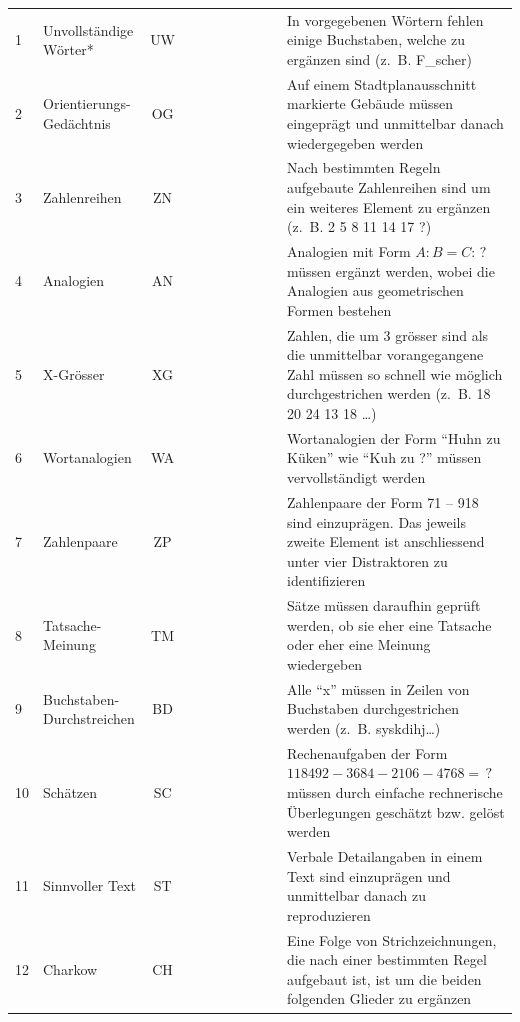 \documentclass[11pt, twoside, a4paper]{book}		%
\begin{document}
\begin{table}
\begin{adjustbox}{width=\textwidth,totalheight=.9\textheight,keepaspectratio}
\begin{threeparttable}
\begin{tabular}{l l c c c c p{.0001cm} c c c p{20cm}}
				\hline
				1				&	Unvollständige Wörter*	&	UW			&&	\checkmark	&&&\checkmark&&& In vorgegebenen Wörtern fehlen einige Buchstaben, welche zu ergänzen sind (z.~B. F\_scher)	\\
				2				&	Orientierungs-Gedächtnis	&	OG		&&&	\checkmark	&&&&\checkmark& Auf einem Stadtplanausschnitt markierte Gebäude müssen eingeprägt und unmittelbar danach wiedergegeben werden\\
				3				&	Zahlenreihen			&	ZN			&	\checkmark	&&&&&\checkmark&& Nach bestimmten Regeln aufgebaute Zahlenreihen sind um ein weiteres Element zu ergänzen (z.~B. 2 5 8 11 14 17 ?)\\
				4				&	Analogien				&	AN			&	\checkmark	&&&&&&\checkmark& Analogien mit Form $A:B=C:\,?$ müssen ergänzt werden, wobei die Analogien aus geometrischen Formen bestehen\\
				5				&	X-Grösser				&	XG			&&	\checkmark	&&&&\checkmark&& Zahlen, die um $3$ grösser sind als die unmittelbar vorangegangene Zahl müssen so schnell wie möglich durchgestrichen werden (z.~B. 18 20 24 \cancel{27} 13 18 \cancel{21} \ldots)\\
				6				&	Wortanalogien			&	WA			&	\checkmark	&&&&\checkmark&&& Wortanalogien der Form \enquote{Huhn zu Küken} wie \enquote{Kuh zu ?} müssen vervollständigt werden\\
				7				&	Zahlenpaare				&	ZP			&&&	\checkmark	&&&\checkmark&& Zahlenpaare der Form 71 -- 918 sind einzuprägen. Das jeweils zweite Element ist anschliessend unter vier Distraktoren zu identifizieren\\
				8				&	Tatsache-Meinung		&	TM			&	\checkmark	&&&&\checkmark&&& Sätze müssen daraufhin geprüft werden, ob sie eher eine Tatsache oder eher eine Meinung wiedergeben\\
				9				&	Buchstaben-Durchstreichen&	BD			&&	\checkmark	&&&&&\checkmark& Alle \enquote{x} müssen in Zeilen von Buchstaben durchgestrichen werden (z.~B. sys\cancel{x}kdihj\cancel{x}\ldots)\\
				10				&	Schätzen				&	SC			&	\checkmark	&&&&&\checkmark&& Rechenaufgaben der Form $118492-3684-2106-4768=\,?$ müssen durch einfache rechnerische Überlegungen geschätzt bzw. gelöst werden\\
				11				&	Sinnvoller Text			&	ST			&&&	\checkmark	&&\checkmark&&& Verbale Detailangaben in einem Text sind einzuprägen und unmittelbar danach zu reproduzieren\\
				12				&	Charkow					&	CH			&	\checkmark	&&&&&&\checkmark& Eine Folge von Strichzeichnungen, die nach einer bestimmten Regel aufgebaut ist, ist um die beiden folgenden Glieder zu ergänzen\\

\end{tabular}
\end{threeparttable}
\end{adjustbox}
\end{table}
\end{document}

